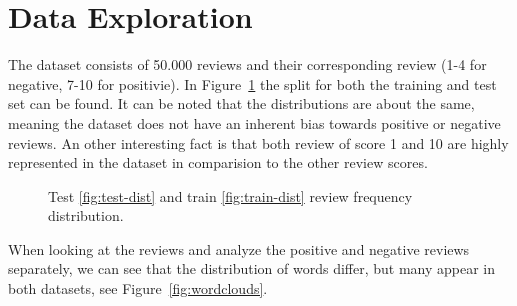 \section{Data Exploration}

The dataset consists of 50.000 reviews and their corresponding review (1-4 for negative, 7-10 for positivie). 
In Figure~\ref{fig:data-dist} the split for both the training and test set can be found.
It can be noted that the distributions are about the same, meaning the dataset does not have an inherent bias towards positive or negative reviews.
An other interesting fact is that both review of score 1 and 10 are highly represented in the dataset in comparision to the other review scores.

\begin{figure}[ht!]
    \centering
    \hfill
  \caption{Test \ref{fig:test-dist} and train \ref{fig:train-dist} review frequency distribution.}
  \label{fig:data-dist} 
\end{figure}

When looking at the reviews and analyze the positive and negative reviews separately, we can see that the distribution of words differ, but many appear in both datasets, see Figure~\ref{fig:wordclouds}.

